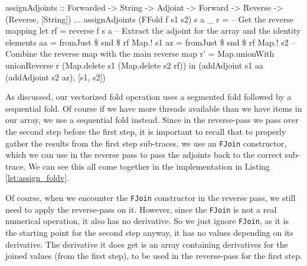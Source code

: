             \begin{haskell}[caption=Reverse pass over a sequential fold, label=lst:assign_fold, gobble=16]
                assignAdjoints :: Forwarded -> String -> Adjoint -> Forward -> Reverse
                    -> (Reverse, [String])
                $\dots$
                assignAdjoints (FFold f s1 s2) s a _ r =
                        -- Get the reverse mapping
                    let rf = reverse f s a
                        -- Extract the adjoint for the array and the identity elements
                        aa = fromJust $\$$ snd $\$$ rf Map.! s1
                        az = fromJust $\$$ snd $\$$ rf Map.! s2
                        -- Combine the reverse map with the main reverse map
                        r' = Map.unionWith unionReverse r (Map.delete s1 (Map.delete s2 rf))
                    in  (addAdjoint s1 aa (addAdjoint s2 az), [s1, s2])
            \end{haskell}

            As discussed, our vectorized fold operation uses a segmented fold followed by a sequential fold.
            Of course if we have more threads available than we have items in our array, we use a sequential fold instead.
            Since in the reverse-pass we pass over the second step before the first step, it is important to recall that to properly gather the results from the first step sub-traces, we use an \texttt{FJoin} constructor, which we can use in the reverse pass to pass the adjoints back to the correct sub-trace.
            We can see this all come together in the implementation in Listing \ref{lst:assign_foldv}.

            Of course, when we encounter the \texttt{FJoin} constructor in the reverse pass, we still need to apply the reverse-pass on it.
            However, since the \texttt{FJoin} is not a real numerical operation, it also has no derivative.
            So we just ignore \texttt{FJoin}, as it is the starting point for the second step anyway, it has no values depending on its derivative.
            The derivative it does get is an array containing derivatives for the joined values (from the first step), to be used in the reverse-pass for the first step.
            
